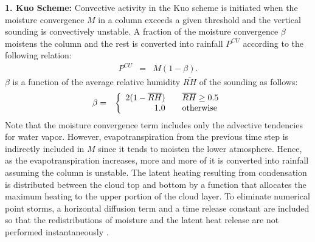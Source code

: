 \noindent
{\bf 1.  Kuo Scheme:}  Convective activity in the Kuo scheme is initiated when the moisture
convergence $M$ in a column exceeds a given threshold and the
vertical sounding is convectively unstable. A fraction of the
moisture convergence $\beta$ moistens the column and the rest is
converted into rainfall $P^{CU}$ according to the following relation:
\begin{eqnarray}
P^{CU}&=&M(1-\beta).
\label{eqn_model:KUOppt}
\end{eqnarray}
$\beta$ is a function of the average relative humidity $\overline{RH}$
of the sounding as follows:
\begin{eqnarray}
\beta&=&\left\{ \begin{array} {r@{\quad\quad}l} 2(1-\overline{RH}) & \overline{RH}\ge 0.5 \\ 1.0 & \mbox{otherwise} \end{array} \right.
\label{eqn_model:Bfact}
\end{eqnarray}
Note that the moisture convergence term includes only the advective
tendencies for water vapor. However, evapotranspiration from the
previous time step is indirectly included in $M$ since it tends to
moisten the lower atmosphere. Hence, as the evapotranspiration
increases, more and more of it is converted into rainfall assuming the
column is unstable. The latent heating resulting from condensation is
distributed between the cloud top and bottom by a function that
allocates the maximum heating to the upper portion of the cloud
layer. To eliminate numerical point storms, a horizontal diffusion
term and a time release constant are included so that the
redistributions of moisture and the latent heat release are not
performed instantaneously \citep{Giorgi_89b, Giorgi_91c}. \\

